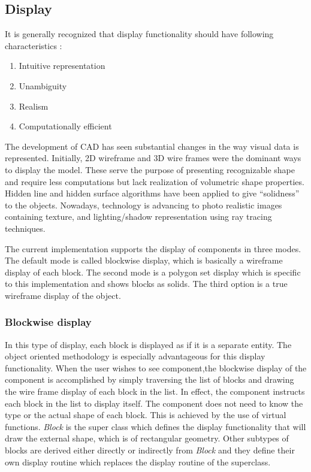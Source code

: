	\subsection{Display}

	It is generally recognized that display functionality should have 
	following characteristics :
	
	\begin{enumerate}

	\item
	Intuitive representation
	\item
	Unambiguity
	\item
	Realism
	\item
	Computationally efficient

	\end{enumerate}

	The development of CAD has seen substantial changes in the way visual data 
	is represented. Initially, 2D wireframe and 3D wire frames were the dominant 	ways to display the model. These serve the purpose of presenting 
	recognizable shape and 
	require less computations but lack realization of volumetric shape 
	properties. Hidden line and hidden surface algorithms have been applied to 
	give ``solidness'' to the objects. Nowadays, technology is advancing to 
	photo realistic images containing texture, and lighting/shadow 
	representation using ray tracing techniques.


	The current implementation supports the display of components in three 
	modes. The default mode is called blockwise display, which is basically
	a wireframe display of each block. The second mode is a polygon set display
	which is specific to this implementation and shows blocks as solids.
	The third option is a true wireframe display of the object.



	\subsubsection{Blockwise display }

	In this type of display, each block is displayed as if it is a separate 
	entity. The object oriented methodology is especially advantageous for 
	this display functionality. When the user wishes to see component,the 
	blockwise display of the component is accomplished by simply traversing 
	the list of blocks and drawing the wire frame display of each block in the 
	list. In effect, the component instructs each block in the list to display 
	itself. The component does not need to know the type or the actual
	shape of each block. This is achieved by the use of virtual functions.
	{\em Block} is the super class which defines the display functionality that
	will draw the external shape, which is of rectangular geometry. Other 
	subtypes
	of blocks are derived either directly or indirectly from {\em Block} and 
	they define their own display routine which replaces the display routine
	of the superclass. 


